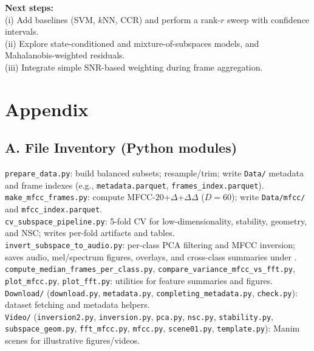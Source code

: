 \documentclass[11pt]{article}
\begin{document}
\textbf{Next steps:} \\
(i) Add baselines (SVM, $k$NN, CCR) and perform a rank-$r$ sweep with confidence intervals.  \\
(ii) Explore state-conditioned and mixture-of-subspaces models, and Mahalanobis-weighted residuals.  \\
(iii) Integrate simple SNR-based weighting during frame aggregation.

\section*{Appendix}

\subsection*{A. File Inventory (Python modules)}

\noindent
\texttt{prepare\_data.py}: build balanced subsets; resample/trim; write \texttt{Data/} metadata and frame indexes (e.g., \texttt{metadata.parquet}, \texttt{frames\_index.parquet}).\\
\texttt{make\_mfcc\_frames.py}: compute MFCC-20+$\Delta$+$\Delta\Delta$ ($D=60$); write \texttt{Data/mfcc/} and \texttt{mfcc\_index.parquet}.\\
\texttt{cv\_subspace\_pipeline.py}: 5-fold CV for low-dimensionality, stability, geometry, and NSC; writes  per-fold artifacts and  tables.\\
\texttt{invert\_subspace\_to\_audio.py}: per-class PCA filtering and MFCC inversion; saves audio, mel/spectrum figures, overlays, and cross-class summaries under .\\
\texttt{compute\_median\_frames\_per\_class.py}, \texttt{compare\_variance\_mfcc\_vs\_fft.py}, \texttt{plot\_mfcc.py}, \texttt{plot\_fft.py}: utilities for feature summaries and figures.\\
\texttt{Download/} (\texttt{download.py}, \texttt{metadata.py}, \texttt{completing\_metadata.py}, \texttt{check.py}): dataset fetching and metadata helpers.\\
\texttt{Video/} (\texttt{inversion2.py}, \texttt{inversion.py}, \texttt{pca.py}, \texttt{nsc.py}, \texttt{stability.py}, \texttt{subspace\_geom.py}, \texttt{fft\_mfcc.py}, \texttt{mfcc.py}, \texttt{scene01.py}, \texttt{template.py}): Manim scenes for illustrative figures/videos.\\
\end{document}
